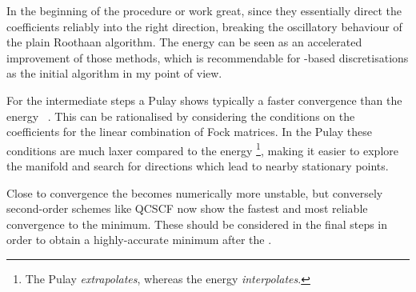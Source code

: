 In the beginning of the procedure \ODA or \tODA work great,
since they essentially direct the coefficients reliably into the right direction,
breaking the oscillatory behaviour of the plain Roothaan algorithm.
The energy \DIIS can be seen as an accelerated improvement of those methods,
which is recommendable for \cGTO-based discretisations
as the initial \SCF algorithm in my point of view.

For the intermediate steps a Pulay \DIIS shows typically a faster
convergence than the energy \DIIS~\cite{Kudin2002}.
This can be rationalised by considering the conditions
on the coefficients for the linear combination of Fock matrices.
In the Pulay \DIIS these conditions are much laxer
compared to the energy \DIIS%
\footnote{The Pulay \DIIS \emph{extrapolates},
whereas the energy \DIIS \emph{interpolates}.},
making it easier to explore the \SCF manifold
and search for directions
which lead to nearby stationary points.

Close to convergence the \DIIS becomes numerically more unstable,
but conversely
second-order \SCF schemes like QCSCF now show the fastest and most reliable
convergence to the \SCF minimum.
These should be considered in the final \SCF steps in order to obtain
a highly-accurate \SCF minimum after the \DIIS.
